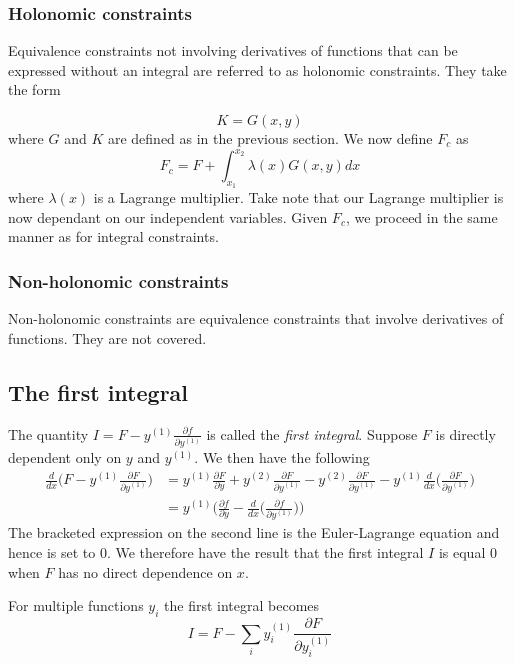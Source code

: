 \documentclass[]{article}
\begin{document}
\subsubsection{Holonomic constraints}
Equivalence constraints not involving derivatives of functions that can be expressed without an integral are referred to as holonomic constraints. They take the form

\begin{equation} K = G(x,y) \end{equation}
where $G$ and $K$ are defined as in the previous section. We now define $F_{c}$ as
\begin{equation} F_{c} = F + \int_{x_{1}}^{x_{2}} \lambda (x) G(x,y)dx \end{equation}
where $\lambda (x)$ is a Lagrange multiplier. Take note that our Lagrange multiplier is now dependant on our independent variables. Given $F_{c}$, we proceed in the same manner as for integral constraints.
\subsubsection{Non-holonomic constraints}
Non-holonomic constraints are equivalence constraints that involve derivatives of functions. They are not covered.
\subsection{The first integral}
The quantity $I = F - y^{(1)}\frac{\partial f}{\partial y^{(1)}}$ is called the \textit{first integral}. Suppose $F$ is directly dependent only on $y$ and $y^{(1)}$. We then have the following
\begin{equation} \begin{split} \frac{d}{dx}\bigg(F - y^{(1)} \frac{\partial F}{\partial y^{(1)}} \bigg) & = y^{(1)}\frac{\partial F}{\partial y} + y^{(2)} \frac{\partial F}{\partial y^{(1)}} - y^{(2)}\frac{\partial F}{\partial y^{(1)}} - y^{(1)}\frac{d}{dx}\bigg( \frac{\partial F}{\partial y^{(1)}} \bigg) \\
& = y^{(1)} \bigg( \frac{\partial f}{\partial y} - \frac{d}{dx} \bigg( \frac{\partial f}{\partial y^{(1)}} \bigg) \bigg)
\end{split} \end{equation}
The bracketed expression on the second line is the Euler-Lagrange equation and hence is set to $0$. We therefore have the result that the first integral $I$ is equal $0$ when $F$ has no direct dependence on $x$.

For multiple functions $y_{i}$ the first integral becomes
\begin{equation} I = F - \sum_{i} y_{i}^{(1)} \frac{\partial F}{\partial  y_{i}^{(1)}} \end{equation}
\end{document}
